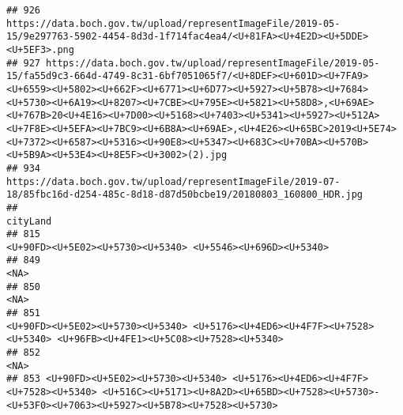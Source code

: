 \documentclass[
]{article}
\begin{document}
\begin{verbatim}
## 926                                                                                                                                                                                                                                                                                                                                                                    https://data.boch.gov.tw/upload/representImageFile/2019-05-15/9e297763-5902-4454-8d3d-1f714fac4ea4/<U+81FA><U+4E2D><U+5DDE><U+5EF3>.png
## 927 https://data.boch.gov.tw/upload/representImageFile/2019-05-15/fa55d9c3-664d-4749-8c31-6bf7051065f7/<U+8DEF><U+601D><U+7FA9><U+6559><U+5802><U+662F><U+6771><U+6D77><U+5927><U+5B78><U+7684><U+5730><U+6A19><U+8207><U+7CBE><U+795E><U+5821><U+58D8>,<U+69AE><U+767B>20<U+4E16><U+7D00><U+5168><U+7403><U+5341><U+5927><U+512A><U+7F8E><U+5EFA><U+7BC9><U+6B8A><U+69AE>,<U+4E26><U+65BC>2019<U+5E74><U+7372><U+6587><U+5316><U+90E8><U+5347><U+683C><U+70BA><U+570B><U+5B9A><U+53E4><U+8E5F><U+3002>(2).jpg
## 934                                                                                                                                                                                                                                                                                                                                                                                 https://data.boch.gov.tw/upload/representImageFile/2019-07-18/85fbc16d-d254-485c-8d18-d87d50bcbe19/20180803_160800_HDR.jpg
##                                                                                                                                                                        cityLand
## 815                                                                                                                   <U+90FD><U+5E02><U+5730><U+5340> <U+5546><U+696D><U+5340>
## 849                                                                                                                                                                        <NA>
## 850                                                                                                                                                                        <NA>
## 851                                                          <U+90FD><U+5E02><U+5730><U+5340> <U+5176><U+4ED6><U+4F7F><U+7528><U+5340> <U+96FB><U+4FE1><U+5C08><U+7528><U+5340>
## 852                                                                                                                                                                        <NA>
## 853 <U+90FD><U+5E02><U+5730><U+5340> <U+5176><U+4ED6><U+4F7F><U+7528><U+5340> <U+516C><U+5171><U+8A2D><U+65BD><U+7528><U+5730>-<U+53F0><U+7063><U+5927><U+5B78><U+7528><U+5730>

\end{verbatim}
\end{document}
